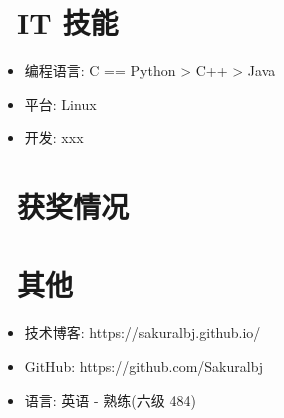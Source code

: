 \documentclass{resume}
\begin{document}
\section{\faCogs\ IT 技能}
\begin{itemize}[parsep=0.5ex]
  \item 编程语言: C == Python > C++ > Java
  \item 平台: Linux
  \item 开发: xxx
\end{itemize}

\section{\faHeartO\ 获奖情况}

\section{\faInfo\ 其他}
\begin{itemize}[parsep=0.5ex]
  \item 技术博客: https://sakuralbj.github.io/
  \item GitHub: https://github.com/Sakuralbj
  \item 语言: 英语 - 熟练(六级 484)
\end{itemize}

%
%
\end{document}
